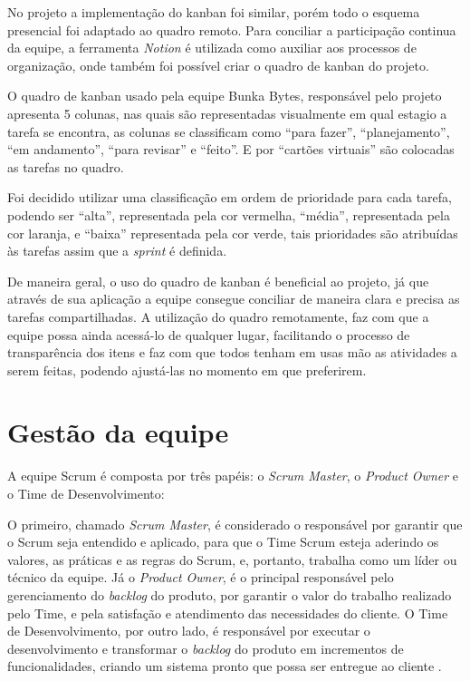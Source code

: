 No projeto  a implementação do kanban foi similar, porém todo o esquema presencial foi adaptado ao quadro remoto. Para conciliar a participação continua da equipe, a ferramenta \textsl{Notion} é utilizada como auxiliar aos processos de organização, onde também foi possível criar o quadro de kanban do projeto. 

O quadro de kanban usado pela equipe Bunka Bytes, responsável pelo projeto apresenta 5 colunas, nas quais são representadas visualmente em qual estagio a tarefa se encontra, as colunas se classificam como ``para fazer'', ``planejamento'', ``em andamento'', ``para revisar'' e ``feito''. E por ``cartões virtuais'' são colocadas as tarefas no quadro.

Foi decidido utilizar uma classificação em ordem de prioridade para cada tarefa, podendo ser ``alta'', representada pela cor vermelha, ``média'', representada pela cor laranja, e ``baixa'' representada pela cor verde, tais prioridades são atribuídas às tarefas assim que a \textsl{sprint} é definida.

De maneira geral, o uso do quadro de kanban é beneficial ao projeto, já que através de sua aplicação a equipe consegue conciliar de maneira clara e precisa as tarefas compartilhadas. A utilização do quadro remotamente, faz com que a equipe possa ainda acessá-lo de qualquer lugar, facilitando o processo de transparência dos itens e faz com que todos tenham em usas mão as atividades a serem feitas, podendo ajustá-las no momento em que preferirem. 

\section{Gestão da equipe}
A equipe Scrum é composta por três papéis: o \textsl{Scrum Master}, o \textsl{Product Owner} e o Time de Desenvolvimento:

\begin{citacao}
O primeiro, chamado \textsl{Scrum Master}, é considerado o responsável por garantir que o Scrum seja entendido e aplicado, para que o Time Scrum esteja aderindo os valores, as práticas e as regras do Scrum, e, portanto, trabalha como um líder ou técnico da equipe. Já o \textsl{Product Owner}, é o principal responsável pelo gerenciamento do \textsl{backlog} do produto, por garantir o valor do trabalho realizado pelo Time, e pela satisfação e atendimento das necessidades do cliente. O Time de Desenvolvimento, por outro lado, é responsável por executar o desenvolvimento e transformar o \textsl{backlog} do produto em incrementos de funcionalidades, criando um sistema pronto que possa ser entregue ao cliente \cite{cruz:2018}.
\end{citacao}


